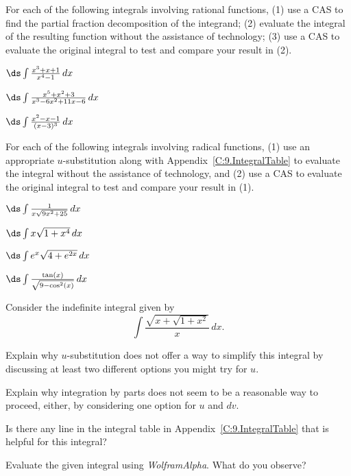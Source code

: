 \begin{exercises} 
  \item For each of the following integrals involving rational functions, (1) use a CAS to find the partial fraction decomposition of the integrand; (2) evaluate the integral of the resulting function without the assistance of technology; (3) use a CAS to evaluate the original integral to test and compare your result in (2).
  \ba
  	\item $\ds \int \frac{x^3 + x + 1}{x^4 - 1} \, dx$
	\item $\ds \int \frac{x^5 + x^2 + 3}{x^3 - 6x^2 + 11x - 6} \, dx$
	\item $\ds \int \frac{x^2 - x - 1}{(x-3)^3} \, dx$
  \ea

  \item For each of the following integrals involving radical functions, (1) use an appropriate $u$-substitution along with Appendix~\ref{C:9.IntegralTable} to evaluate the integral without the assistance of technology, and (2) use a CAS to evaluate the original integral to test and compare your result in (1).
  \ba
  	\item $\ds \int \frac{1}{x \sqrt{9x^2 + 25}} \, dx$
	\item $\ds \int x \sqrt{1 + x^4} \, dx$
	\item $\ds \int  e^x \sqrt{4 + e^{2x}} \, dx$
	\item $\ds \int \frac{\tan(x)}{\sqrt{9 - \cos^2(x)}}  \, dx$
  \ea

  
  \item Consider the indefinite integral given by
   $$\int \frac{\sqrt{x+\sqrt{1+x^2}}}{x} \, dx.$$
  	\ba
		\item Explain why $u$-substitution does not offer a way to simplify this integral by discussing at least two different options you might try for $u$.
		\item Explain why integration by parts does not seem to be a reasonable way to proceed, either, by considering one option for $u$ and $dv$.
		\item Is there any line in the integral table in Appendix~\ref{C:9.IntegralTable} that is helpful for this integral?
		\item Evaluate the given integral using \emph{WolframAlpha}.  What do you observe?
	\ea	
\end{exercises}
\afterexercises
